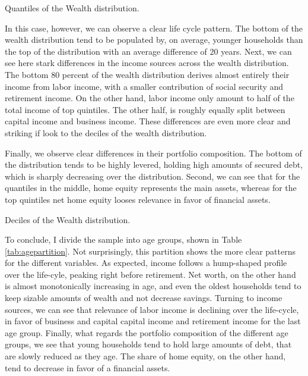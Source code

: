\documentclass[11pt, a4paper, leqno]{article}
\begin{document}
\begin{table}[H]
    \caption{Quantiles of the Wealth distribution.}
    \resizebox{\textwidth}{!}{}
    \label{tab:quintilesnetworth}
\end{table}

In this case, however, we can observe a clear life cycle pattern. The bottom of the wealth distribution tend to be populated by, on average, younger households than the top of the distribution with an average difference of $20$ years. Next, we can see here stark differences in the income sources across the wealth distribution. The bottom $80$ percent of the wealth distribution derives almost entirely their income from labor income, with a smaller contribution of social security and retirement income. On the other hand, labor income only amount to half of the total income of top quintiles. The other half, is roughly equally split between capital income and business income. These differences are even more clear and striking if look to the deciles of the wealth distribution.

Finally, we observe clear differences in their portfolio composition. The bottom of the distribution tends to be highly levered, holding high amounts of secured debt, which is sharply decreasing over the distribution. Second, we can see that for the quantiles in the middle, home equity represents the main assets, whereas for the top quintiles net home equity looses relevance in favor of financial assets.

\begin{table}
    \caption{Deciles of the Wealth distribution.}
    \resizebox{\textwidth}{!}{}
    \label{tab:decilesnetworth}
\end{table}

To conclude, I divide the sample into age groups, shown in Table \ref*{tab:agepartition}. Not surprisingly, this partition shows the more clear patterns for the different variables. As expected, income follows a hump-shaped profile over the life-cyle, peaking right before retirement. Net worth, on the other hand is almost monotonically increasing in age, and even the oldest households tend to keep sizable amounts of wealth and not decrease savings. Turning to income sources, we can see that relevance of labor income is declining over the life-cycle, in favor of business and capital capital income and retirement income for the last age group. Finally, what regards the portfolio composition of the different age groups, we see that young households tend to hold large amounts of debt, that are slowly reduced as they age. The share of home equity, on the other hand, tend to decrease in favor of a financial assets.
\end{document}
